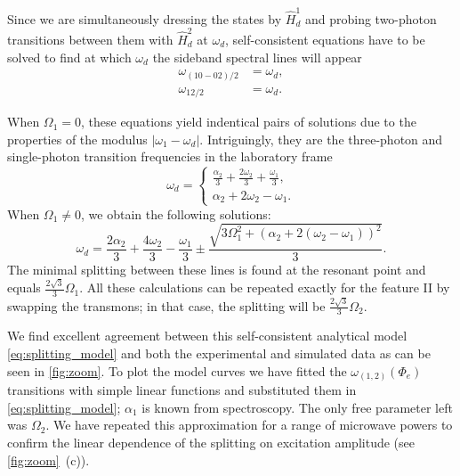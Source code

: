 \documentclass[%
 pra,
 amsmath,amssymb,
 reprint,%
]{revtex4-1}
\begin{document}
Since we are simultaneously dressing the states by $\hat H_d^1$ and probing two-photon transitions between them with $\hat H_d^2$ at $\omega_d$, self-consistent equations have to be solved to find at which $\omega_d$ the sideband spectral lines will appear
\begin{equation}
\begin{aligned}
\omega_{(10-02)/2} &= \omega_d,\\
\omega_{12/2} &= \omega_d.
\end{aligned}
\label{eq:two-photon}
\end{equation}

When $\Omega_1 = 0$, these equations yield indentical pairs of solutions due to the properties of the modulus $|\omega_1 - \omega_d|$. Intriguingly, they are the three-photon and single-photon transition frequencies in the laboratory frame
\begin{equation}
\omega_d = \begin{cases} \frac{\alpha_2}{3} + \frac{2 \omega_{2}}{3} + \frac{\omega_{1}}{3}, \\ \alpha_2 + 2 \omega_{2} - \omega_{1}.\end{cases}
\end{equation}
When $\Omega_1 \neq 0$, we obtain the following solutions:
\begin{equation}
\omega_d = \frac{2 \alpha_2}{3} + \frac{4 \omega_{2}}{3} - \frac{\omega_{1}}{3} \pm \frac{\sqrt{3 \Omega_{1}^{2} + \left( \alpha_2 + 2 (\omega_{2} - \omega_{1})\right)^{2}}}{3}.
\label{eq:splitting_model}
\end{equation}
The minimal splitting between these lines is 
found at the resonant point and equals $\frac{2 
\sqrt{3}}{{3}} \Omega_1$. All these calculations 
can be repeated exactly for the feature II by 
swapping the transmons; in that case, the 
splitting will be $\frac{2 \sqrt{3}}{{3}} 
\Omega_2$.

We find excellent agreement between this self-consistent analytical model \autoref{eq:splitting_model} and 
both the experimental and simulated data as can 
be seen in \autoref{fig:zoom}. To plot the model 
curves we have fitted the 
$\omega_{(1,2)}(\Phi_e)$ transitions with simple 
linear functions and substituted them in 
\autoref{eq:splitting_model}; $\alpha_1$ is known 
from spectroscopy. The only free parameter left 
was $\Omega_2$. We have repeated this 
approximation for a range of microwave powers to 
confirm the linear dependence of the splitting on 
excitation amplitude (see \autoref{fig:zoom}~(c)).
\end{document}
